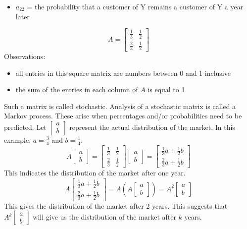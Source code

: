 \documentclass[12pt]{article}
\begin{document}
\begin{example}
\begin{itemize}
\item $a_{22}$ = the probability that a customer of Y remains a customer of Y a year later \end{itemize} $$A = \begin{bmatrix} \frac{1}{3} & \frac{1}{2} \\ \frac{2}{3} & \frac{1}{2} \end{bmatrix} $$ Observations: \begin{itemize} \item all entries in this square matrix are numbers between 0 and 1 inclusive \item the sum of the entries in each column of $A$ is equal to 1 \end{itemize} Such a matrix is called stochastic. Analysis of a stochastic matrix is called a Markov process. These arise when percentages and/or probabilities need to be predicted. \newline Let $\begin{bmatrix} a \\ b \end{bmatrix}$ represent the actual distribution of the market. In this example, $a = \frac{3}{4}$ and $b = \frac{1}{4}$. $$ A\begin{bmatrix} a \\ b \end{bmatrix} = \begin{bmatrix} \frac{1}{3} & \frac{1}{2} \\ \frac{2}{3} & \frac{1}{2} \end{bmatrix}\begin{bmatrix} a \\ b \end{bmatrix} = \begin{bmatrix} \frac{1}{3}a + \frac{1}{2}b \\ \frac{2}{3}a + \frac{1}{2}b \end{bmatrix} $$ This indicates the distribution of the market after one year. 
$$A\begin{bmatrix} \frac{1}{3}a + \frac{1}{2}b \\ \frac{2}{3}a + \frac{1}{2}b \end{bmatrix} = A(A\begin{bmatrix} a \\ b \end{bmatrix}) = A^2\begin{bmatrix} a \\ b \end{bmatrix} $$ This gives the distribution of the market after 2 years. This suggests that $A^k\begin{bmatrix} a \\ b \end{bmatrix}$ will give us the distribution of the market after $k$ years. 

\end{example}
\end{document}
